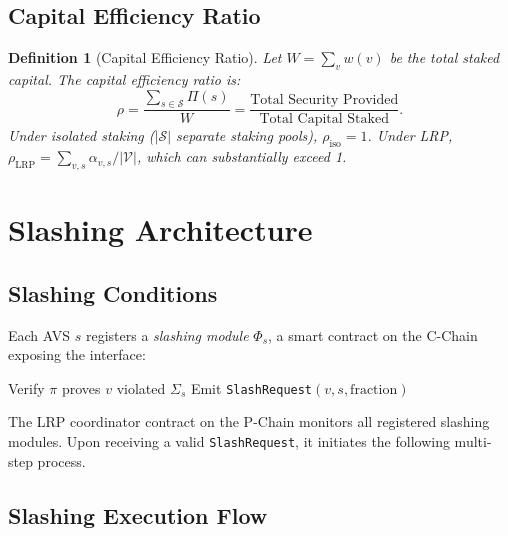 \documentclass[11pt]{article}
\newtheorem{definition}{Definition}
\begin{document}
\subsection{Capital Efficiency Ratio}

\begin{definition}[Capital Efficiency Ratio]
Let $W = \sum_{v} w(v)$ be the total staked capital. The capital efficiency ratio is:
\[
  \rho = \frac{\sum_{s \in \mathcal{S}} \Pi(s)}{W} = \frac{\text{Total Security Provided}}{\text{Total Capital Staked}}.
\]
Under isolated staking ($|\mathcal{S}|$ separate staking pools), $\rho_{\text{iso}} = 1$.
Under LRP, $\rho_{\text{LRP}} = \sum_{v,s} \alpha_{v,s} / |\mathcal{V}|$, which can
substantially exceed 1.
\end{definition}

\section{Slashing Architecture}
\label{sec:slashing}

\subsection{Slashing Conditions}

Each AVS $s$ registers a \emph{slashing module} $\Phi_s$, a smart contract on the C-Chain
exposing the interface:

\begin{algorithmic}
  \State Verify $\pi$ proves $v$ violated $\Sigma_s$
  \State Emit \texttt{SlashRequest}$(v, s, \text{fraction})$
\EndFunction
\end{algorithmic}

The LRP coordinator contract on the P-Chain monitors all registered slashing modules.
Upon receiving a valid \texttt{SlashRequest}, it initiates the following multi-step process.

\subsection{Slashing Execution Flow}
\end{document}
